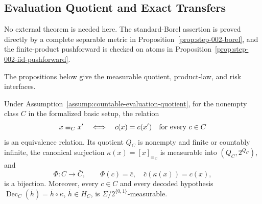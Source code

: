 \subsection{Evaluation Quotient and Exact Transfers}\label{app:step_002}


No external theorem is needed here. The standard-Borel assertion is proved
directly by a
complete separable metric in Proposition~\ref{prop:step-002-borel}, and the
finite-product pushforward is checked on atoms in
Proposition~\ref{prop:step-002-iid-pushforward}.

The propositions below give the measurable quotient, product-law, and risk
interfaces.

\begin{proposition}\label{prop:step-002-factorization}
Under Assumption~\ref{assump:countable-evaluation-quotient}, for the nonempty
class \(C\) in the formalized basic setup, the relation
\[
x\equiv_Cx'\quad\Longleftrightarrow\quad
c(x)=c(x')\quad\hbox{for every }c\in C
\]
is an equivalence relation. Its quotient \(Q_C\) is nonempty and finite or
countably infinite, the canonical surjection
\(\kappa(x)=[x]_{\equiv_C}\) is measurable into \((Q_C,2^{Q_C})\), and
\[
\Phi:C\longrightarrow\bar C,\qquad \Phi(c)=\bar c,
\quad \bar c(\kappa(x))=c(x),
\]
is a bijection. Moreover, every \(c\in C\) and every decoded hypothesis
\(\operatorname{Dec}_C(\bar h)=\bar h\circ\kappa\),
\(\bar h\in H_C\), is \(\Sigma/2^{\{0,1\}}\)-measurable.


\end{proposition}

